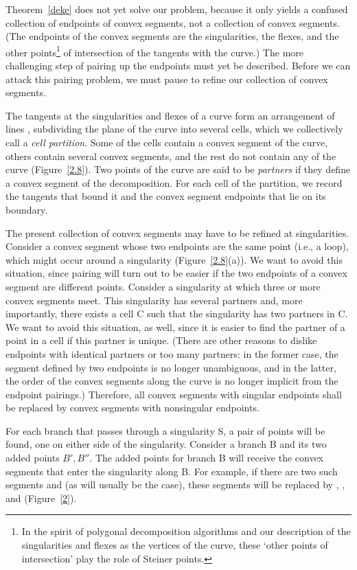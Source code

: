 Theorem~\ref{deke} does not yet solve our problem, because it only yields a
confused collection of endpoints of convex segments, not a collection of 
convex segments.
(The endpoints of the convex segments are the singularities, the flexes, and
the other points\footnote{In the spirit 
	of polygonal decomposition algorithms and our description 
	of the singularities and flexes as the vertices of the curve,
	these `other points of intersection' play the role of Steiner points.}
of intersection of the tangents with the curve.)
The more challenging step of pairing up the endpoints must yet be described.
Before we can attack this pairing problem, we must pause to
refine our collection of convex segments.

The tangents at the singularities and flexes of a curve form an
arrangement of lines \cite{edelsbrunner}, subdividing the plane
of the curve into several cells, which we collectively call a 
{\em cell partition}.
Some of the cells contain a convex segment of the curve, 
others contain several convex segments, and the rest
do not contain any of the curve (Figure~\ref{2.8}).
Two points of the curve are said to be {\em partners} if they 
define a convex segment of the decomposition.
\ifFull
For each cell of the partition, we record the tangents that bound it
and the convex segment endpoints that lie on its boundary.
\fi

The present collection of convex segments may have to be refined at 
singularities.
Consider a convex segment whose two endpoints are the same 
point (i.e., a loop), which might occur around a 
singularity (Figure~\ref{2.8}(a)).
We want to avoid this situation, since pairing will turn out to be easier if 
the two endpoints of a convex segment are different points.
Consider a singularity at which three or more convex segments meet.
This singularity has several partners and, more importantly,
there exists a cell C such that the singularity has two partners in C.
We want to avoid this situation, as well, since
it is easier to find the partner of a point in a cell if this 
partner is unique.
(There are other reasons to dislike endpoints with identical partners or 
too many partners: in the former case, 
the segment defined by two endpoints is no longer unambiguous, and in the
latter, the order of the convex segments along the curve is no longer
implicit from the endpoint pairings.)
Therefore, all convex segments with singular endpoints shall be replaced by
convex segments with nonsingular endpoints.

For each branch that passes through a singularity S, a pair of points will
be found, one on either side of the singularity.
Consider a branch B and its two added points $B',B''$.
The added points for branch B 
will receive the convex segments that enter the singularity along B.
For example, if there are two such segments  and  (as will
usually be the case), these segments will be replaced by ,
, and  (Figure~\ref{2}).

